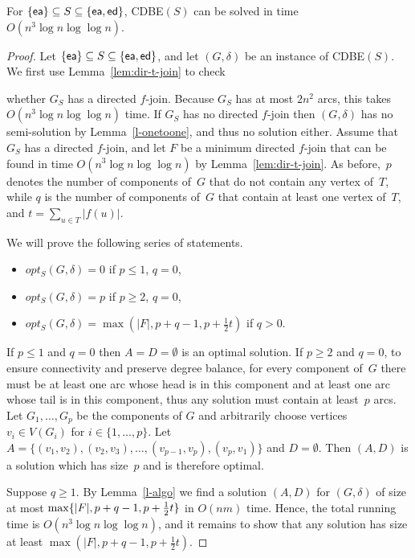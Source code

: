 \documentclass[11pt]{llncs}
\newcommand{\opts}{opt_S}
\newcommand{\ed}{{\sf ed}}
\newcommand{\ea}{{\sf ea}}
\newcommand{\cdbe}{{\sc CDBE}}
\begin{document}
\begin{theorem}\label{thm:edit-dir}
For $\{\ea\}\subseteq S \subseteq \{\ea,\ed\}$,  \cdbe$(S)$ can be
solved in time $O(n^3\log n \log \log n)$.
\end{theorem}


\begin{proof}
\begin{sloppypar}
Let  $\{\ea\}\subseteq S \subseteq \{\ea,\ed\}$, and let $(G,\delta)$ be an
instance of \cdbe$(S)$.  We first use Lemma~\ref{lem:dir-t-join} to check
\end{sloppypar}
whether $G_S$ has a directed $f$-join.  Because $G_S$ has at most $2n^2$ arcs,
this takes $O(n^3\log n \log \log n)$ time.  If $G_S$ has no directed $f$-join
then $(G,\delta)$ has no semi-solution by Lemma~\ref{l-onetoone}, and thus no
solution either.  
Assume that $G_S$ has a directed $f$-join, and let $F$ be a minimum directed
$f$-join that can be found in time $O(n^3\log n \log \log n)$ by Lemma~\ref{lem:dir-t-join}. 
As before,~$p$ denotes the
number of components of~$G$ that do not contain any vertex of~$T$, while
$q$ is the number of components of~$G$ that contain at least
one vertex of~$T$, 
and $t=\sum_{u\in T}|f(u)|$. 

We will prove the following series of statements.

\begin{itemize}
\item $\opts(G,\delta)=0$ if $p \leq 1$, $q=0$,
\item $\opts(G,\delta)=p$ if $p \geq 2$, $q=0$,
\item $\opts(G,\delta)=\max(|F|,p+q-1,p+\frac{1}{2}t)$ if $q >0$.
\end{itemize}

If $p \leq1$ and $q=0$ then $A=D=\emptyset$ is an optimal solution.  If
$p\geq 2$ and $q=0$, to ensure connectivity and preserve degree balance, for
every component of~$G$ there must be at least one arc whose head is in this
component and at least one arc whose tail is in this component, thus any
solution must contain at least~$p$ arcs. Let $G_1,\ldots,G_p$ be the components
of $G$ and arbitrarily choose vertices $v_i \in V(G_i)$ for $i\in
\{1,\ldots,p\}$. Let $A=\{(v_1,v_2),(v_2,v_3),\ldots,(v_{p-1},v_p),(v_p,v_1)\}$
and $D=\emptyset$.  Then $(A,D)$ is a solution which has size~$p$ and is
therefore optimal.

Suppose $q\geq 1$.  By Lemma~\ref{l-algo} we find a solution $(A,D)$ for
$(G,\delta)$ of size at most $\max\{|F|,\allowbreak p+\nobreak q-\nobreak 1,\allowbreak p+\nobreak \frac{1}{2}t\}$ in $O(nm)$
time.  Hence, the total running time is $O(n^3\log n \log \log n)$, and it
remains to show that any solution has size at least
$\max(|F|,p+q-1,p+\frac{1}{2}t)$. 


\end{proof}
\end{document}
